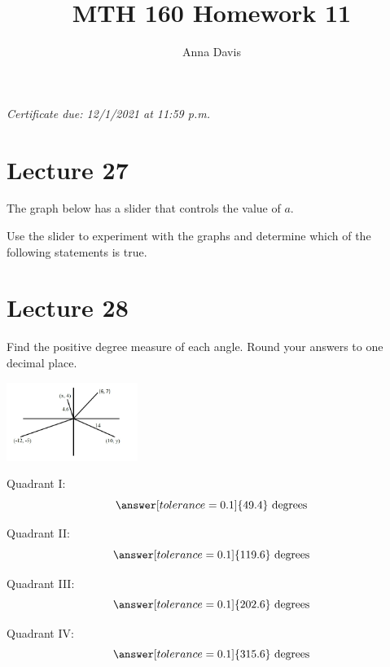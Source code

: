 \documentclass{ximera}
\author{Anna Davis} \title{MTH 160 Homework 11}
\begin{document}
\begin{abstract}

\end{abstract}
\maketitle
 \textit{Certificate due: 12/1/2021 at 11:59 p.m.}
 

\section{Lecture 27}

\begin{problem}\label{prob:160hom11prob5}  
 The graph below has a slider that controls the value of $a$. 
  \begin{center} 
\end{center}
Use the slider to experiment with the graphs and determine which of the following statements is true.
\begin{multipleChoice}  
\end{multipleChoice}  
\end{problem}  
  
 \section{Lecture 28}
\begin{problem}\label{prob:160hom11prob1}
Find the positive degree measure of each angle. Round your answers to one decimal place.
\begin{image}
   
\includegraphics[height=1in]{160H11pic1.jpg}~
 
\end{image}

Quadrant I:
$$\answer[tolerance=0.1]{49.4}\mbox{ degrees}$$

Quadrant II:
$$\answer[tolerance=0.1]{119.6}\mbox{ degrees}$$

Quadrant III:
$$\answer[tolerance=0.1]{202.6}\mbox{ degrees}$$

Quadrant IV:
$$\answer[tolerance=0.1]{315.6}\mbox{ degrees}$$
\end{problem}
 
\end{document}
